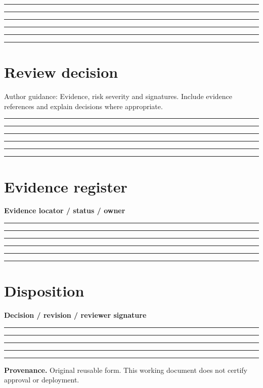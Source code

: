 \documentclass[11pt,letterpaper]{article}
\newcommand{\ResponseLine}{\par\vspace{1.05em}\noindent\rule{\linewidth}{0.4pt}\par}
\newcommand{\ResponseArea}{\ResponseLine\ResponseLine\ResponseLine}
\begin{document}
\ResponseArea\ResponseArea
\section{Review decision}
Author guidance: Evidence, risk severity and signatures. Include evidence references and explain decisions where appropriate.


\ResponseArea\ResponseArea
\section{Evidence register}
\textbf{Evidence locator / status / owner}\ResponseArea\ResponseArea
\section{Disposition}
\textbf{Decision / revision / reviewer signature}\ResponseArea\ResponseLine
\vfill
\hrule
{\footnotesize\textbf{Provenance.} Original reusable form. This working document does not certify approval or deployment.}
\end{document}
